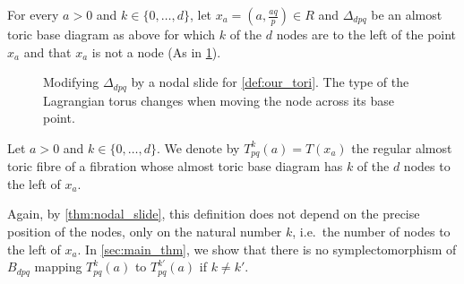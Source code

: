 \documentclass[AIF,Unicode,manuscript]{cedram}
\begin{document}
For every $a > 0$ and $k \in \{0,\ldots,d\}$, let $x_a = \left( a,\frac{aq}{p} \right) \in R$ and $\Delta_{dpq}$ be an almost toric base diagram as above for which $k$ of the $d$ nodes are to the left of the point $x_a$ and that $x_a$ is not a node (As in \cref{fig:our_tori}).

\begin{figure}
  \centering
  \caption{Modifying $Δ_{dpq}$ by a nodal slide for \cref{def:our_tori}. The type of the Lagrangian torus changes when moving the node across its base point.}
  \label{fig:our_tori}
\end{figure}

\begin{definition}
  \label{def:our_tori}
    Let $a>0$ and $k \in \{0,\ldots,d\}$.
We denote by $T^k_{pq}(a) = T(x_a)$ the regular almost toric fibre of a fibration whose almost toric base diagram has $k$ of the $d$ nodes to the left of $x_a$. 
\end{definition}

Again, by \cref{thm:nodal_slide}, this definition does not depend on the precise position of the nodes, only on the natural number $k$, i.e.\ the number of nodes to the left of $x_a$.
In \cref{sec:main_thm}, we show that there is no symplectomorphism of $B_{dpq}$ mapping $T^k_{pq}(a)$ to $T^{k'}_{pq}(a)$ if $k \neq k'$.
\end{document}
